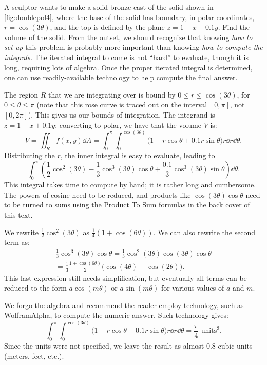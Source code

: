 \begin{example}\label{ex_doublepol4}
A sculptor wants to make a solid bronze cast of the solid shown in \autoref{fig:doublepol4}, where the base of the solid has boundary, in polar coordinates, $r=\cos(3\theta)$, and the top is defined by the plane $z=1-x+0.1y$. Find the volume of the solid.
\solution
From the outset, we should recognize that knowing \emph{how to set up} this problem is probably more important than knowing \emph{how to compute the integrals.} The iterated integral to come is not ``hard'' to evaluate, though it is long, requiring lots of algebra. Once the proper iterated integral is determined, one can use readily-available technology to help compute the final answer. 

The region $R$ that we are integrating over is bound by $0\leq r\leq \cos(3\theta)$, for $0\leq \theta\leq\pi$ (note that this rose curve is traced out on the interval $[0,\pi]$, not $[0,2\pi]$). This gives us our bounds of integration. The integrand is $z=1-x+0.1y$; converting to polar, we have that the volume $V$ is:
\[V = \iint_R f(x,y)\dd A = \int_0^\pi\int_0^{\cos(3\theta)}\bigl(1-r\cos\theta+0.1r\sin\theta\bigr)r\dd r\dd\theta.\]
Distributing the $r$, the inner integral is easy to evaluate, leading to 
\[ \int_0^\pi \left(\frac12\cos^2(3\theta)-\frac13\cos^3(3\theta)\cos\theta
+\frac{0.1}3\cos^3(3\theta)\sin\theta\right)\dd\theta.\]
This integral takes time to compute by hand; it is rather long and cumbersome. The powers of cosine need to be reduced, and products like $\cos(3\theta)\cos\theta$ need to be turned to sums using the Product To Sum formulas in the back cover of this text. 

We rewrite $\frac12\cos^2(3\theta)$ as $\frac14(1+\cos(6\theta))$. We can also rewrite the second term as: 
\begin{multline*}
 \frac13\cos^3(3\theta)\cos\theta = \frac13\cos^2(3\theta)\cos(3\theta)\cos\theta\\
 = \frac13\frac{1+\cos(6\theta)}2\bigl(\cos(4\theta)+\cos(2\theta)\bigr).
\end{multline*}
This last expression still needs simplification, but eventually all terms can be reduced to the form $a\cos(m\theta)$ or $a\sin(m\theta)$ for various values of $a$ and $m$.

We forgo the algebra and recommend the reader employ technology, such as WolframAlpha\textregistered, to compute the numeric answer. Such technology gives:
\[\int_0^\pi\int_0^{\cos(3\theta)}\bigl(1-r\cos\theta+0.1r\sin\theta\bigr)r\dd r\dd\theta = \frac{\pi}{4} %
\text{ units}^3.\]
Since the units were not specified, we leave the result as almost $0.8$ cubic units (meters, feet, etc.).%
\end{example}

